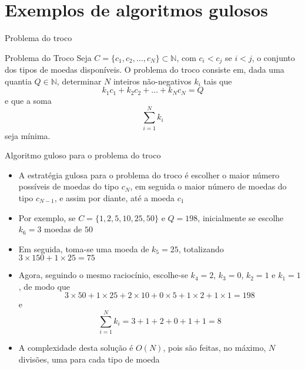 \section{Exemplos de algoritmos gulosos}

\begin{frame}[fragile]{Problema do troco}

    \begin{block}{Problema do Troco}
        Seja $C = \lbrace c_1, c_2, \ldots, c_N\rbrace\subset \mathbb{N}$, com $c_i < c_j$ se 
        $i < j$, o conjunto dos tipos de moedas disponíveis.
        O problema do troco consiste em, dada uma quantia $Q\in\mathbb{N}$, determinar $N$ inteiros 
        não-negativos $k_i$ tais que
        \[
            k_1c_1 + k_2c_2 + \ldots + k_Nc_N = Q
        \] e que a soma
        \[
            \sum_{i = 1}^N k_i
        \]
        seja mínima.
    \end{block}

\end{frame}

\begin{frame}[fragile]{Algoritmo guloso para o problema do troco}

    \begin{itemize}
        \item A estratégia gulosa para o problema do troco é escolher o maior número possíveis
            de moedas do tipo $c_N$, em seguida o maior número de moedas do tipo $c_{N - 1}$,
            e assim por diante, até a moeda $c_1$

        \item Por exemplo, se $C = \lbrace 1, 2, 5, 10, 25, 50\rbrace$ e $Q = 198$, inicialmente
            se escolhe $k_6 = 3$ moedas de $50$

        \item Em seguida, toma-se uma moeda de $k_5 = 25$, totalizando $3\times 150 + 1\times 25 = 75$

        \item Agora, seguindo o mesmo raciocínio, escolhe-se $k_4 = 2$, $k_3 = 0$, $k_2 = 1$ e 
            $k_1 = 1$, de modo que
        \[
            3\times 50 + 1\times 25 + 2\times 10 + 0\times 5 + 1\times 2 + 1\times 1 = 198
        \]
        e
        \[
            \sum_{i = 1}^N k_i = 3 + 1 + 2 + 0 + 1 + 1 = 8
        \]

        \item A complexidade desta solução é $O(N)$, pois são feitas, no máximo, $N$ divisões,
            uma para cada tipo de moeda
            
    \end{itemize}

\end{frame}

